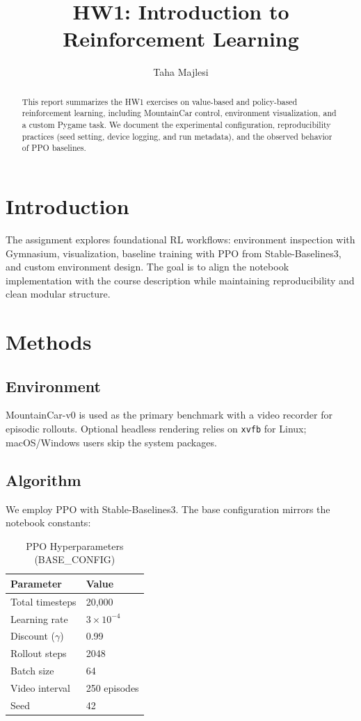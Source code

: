 \documentclass[conference]{IEEEtran}
\title{HW1: Introduction to Reinforcement Learning}
\author{Taha Majlesi}
\begin{document}
\maketitle

\begin{abstract}
This report summarizes the HW1 exercises on value-based and policy-based reinforcement learning, including MountainCar control, environment visualization, and a custom Pygame task. We document the experimental configuration, reproducibility practices (seed setting, device logging, and run metadata), and the observed behavior of PPO baselines.
\end{abstract}

\section{Introduction}
The assignment explores foundational RL workflows: environment inspection with Gymnasium, visualization, baseline training with PPO from Stable-Baselines3, and custom environment design. The goal is to align the notebook implementation with the course description while maintaining reproducibility and clean modular structure.

\section{Methods}
\subsection{Environment}
MountainCar-v0 is used as the primary benchmark with a video recorder for episodic rollouts. Optional headless rendering relies on \texttt{xvfb} for Linux; macOS/Windows users skip the system packages.

\subsection{Algorithm}
We employ PPO with Stable-Baselines3. The base configuration mirrors the notebook constants:
\begin{table}[h]
    \centering
    \caption{PPO Hyperparameters (BASE\_CONFIG)}
    \begin{tabular}{ll}
        \toprule
        Parameter & Value \\
        \midrule
        Total timesteps & 20{,}000 \\
        Learning rate & $3\times10^{-4}$ \\
        Discount ($\gamma$) & 0.99 \\
        Rollout steps & 2048 \\
        Batch size & 64 \\
        Video interval & 250 episodes \\
        Seed & 42 \\
        \bottomrule
    \end{tabular}
\end{table}
\end{document}
